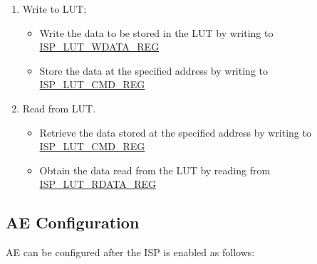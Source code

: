 \documentclass[main\_\_EN.tex]{subfiles}
\begin{document}
\begin{enumerate}
    \item Write to LUT;
    \begin{itemize}
        \item Write the data to be stored in the LUT by writing to \hyperref[regdesc:ISPLUTWDATAREG]{ISP\_LUT\_WDATA\_REG}
        \item Store the data at the specified address by writing to \hyperref[regdesc:ISPLUTCMDREG]{ISP\_LUT\_CMD\_REG}
    \end{itemize}

    \item Read from LUT.
    \begin{itemize}
        \item Retrieve the data stored at the specified address by writing to \hyperref[regdesc:ISPLUTCMDREG]{ISP\_LUT\_CMD\_REG}
        \item Obtain the data read from the LUT by reading from \hyperref[regdesc:ISPLUTRDATAREG]{ISP\_LUT\_RDATA\_REG}
    \end{itemize}
\end{enumerate}




\subsection{AE Configuration}
AE can be configured after the ISP is enabled as follows:
\end{document}
